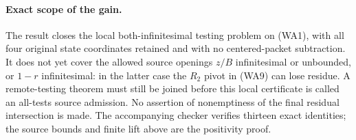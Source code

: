 \paragraph{Exact scope of the gain.}
The result closes the local both-infinitesimal testing problem on
(WA1), with all four original state coordinates retained and with
no centered-packet subtraction. It does not yet cover the allowed
source openings $z/B$ infinitesimal or unbounded, or $1-r$
infinitesimal: in the latter case the $R_2$ pivot in (WA9) can
lose residue. A remote-testing theorem must still be joined before
this local certificate is called an all-tests source admission.
No assertion of nonemptiness of the final residual intersection
is made. The accompanying checker verifies thirteen exact
identities; the source bounds and finite lift above are the
positivity proof.
